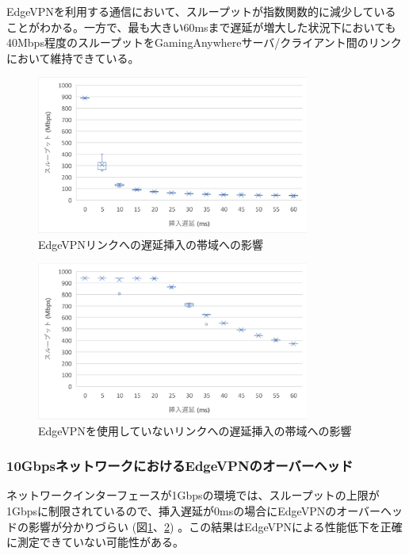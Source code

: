 EdgeVPNを利用する通信において、スループットが指数関数的に減少していることがわかる。一方で、最も大きい60msまで遅延が増大した状況下においても40Mbps程度のスループットをGamingAnywhereサーバ/クライアント間のリンクにおいて維持できている。

\begin{figure}[t]
    \centering
    \includegraphics[width=0.8\textwidth,keepaspectratio,clip]{img/bandwidth_withEdgeVPN.pdf}
    \caption{EdgeVPNリンクへの遅延挿入の帯域への影響}
    \label{fig:band_with_edge}
\end{figure}

\begin{figure}[t]
    \centering
    \includegraphics[width=0.8\textwidth,keepaspectratio,clip]{img/bandwidth_withoutEdgeVPN.pdf}
    \caption{EdgeVPNを使用していないリンクへの遅延挿入の帯域への影響}
    \label{fig:band_without_edge}
\end{figure}

\subsubsection{10GbpsネットワークにおけるEdgeVPNのオーバーヘッド}
ネットワークインターフェースが1Gbpsの環境では、スループットの上限が1Gbpsに制限されているので、挿入遅延が0msの場合にEdgeVPNのオーバーヘッドの影響が分かりづらい (図\ref{fig:band_with_edge}、\ref{fig:band_without_edge}) 。この結果はEdgeVPNによる性能低下を正確に測定できていない可能性がある。

